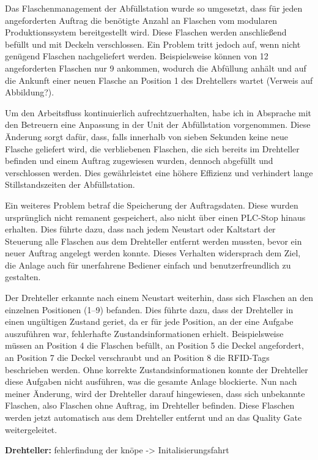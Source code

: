 Das Flaschenmanagement der Abfüllstation wurde so umgesetzt, dass für jeden angeforderten Auftrag die benötigte Anzahl an Flaschen vom modularen 
Produktionssystem bereitgestellt wird. Diese Flaschen werden anschließend befüllt und mit Deckeln verschlossen. Ein Problem tritt jedoch auf, 
wenn nicht genügend Flaschen nachgeliefert werden. Beispielsweise können von 12 angeforderten Flaschen nur 9 ankommen, wodurch die Abfüllung 
anhält und auf die Ankunft einer neuen Flasche an Position 1 des Drehtellers wartet (Verweis auf Abbildung?).

Um den Arbeitsfluss kontinuierlich aufrechtzuerhalten, habe ich in Absprache mit den Betreuern eine Anpassung in der Unit der Abfüllstation 
vorgenommen. Diese Änderung sorgt dafür, dass, falls innerhalb von sieben Sekunden keine neue Flasche geliefert wird, die verbliebenen Flaschen, 
die sich bereits im Drehteller befinden und einem Auftrag zugewiesen wurden, dennoch abgefüllt und verschlossen werden. Dies gewährleistet eine 
höhere Effizienz und verhindert lange Stillstandszeiten der Abfüllstation.

Ein weiteres Problem betraf die Speicherung der Auftragsdaten. Diese wurden ursprünglich nicht remanent gespeichert, also nicht über einen 
PLC-Stop hinaus erhalten. Dies führte dazu, dass nach jedem Neustart oder Kaltstart der Steuerung alle Flaschen aus dem Drehteller entfernt 
werden mussten, bevor ein neuer Auftrag angelegt werden konnte. Dieses Verhalten widersprach dem Ziel, die Anlage auch für unerfahrene Bediener 
einfach und benutzerfreundlich zu gestalten.

Der Drehteller erkannte nach einem Neustart weiterhin, dass sich Flaschen an den einzelnen Positionen (1–9) befanden. Dies führte dazu, dass der 
Drehteller in einen ungültigen Zustand geriet, da er für jede Position, an der eine Aufgabe auszuführen war, fehlerhafte Zustandsinformationen 
erhielt. Beispielsweise müssen an Position 4 die Flaschen befüllt, an Position 5 die Deckel angefordert, an Position 7 die Deckel verschraubt und 
an Position 8 die RFID-Tags beschrieben werden. Ohne korrekte Zustandsinformationen konnte der Drehteller diese Aufgaben nicht ausführen, was die 
gesamte Anlage blockierte. Nun nach meiner Änderung, wird der Drehteller darauf hingewiesen, dass sich unbekannte Flaschen, also Flaschen ohne 
Auftrag, im Drehteller befinden. Diese Flaschen werden jetzt automatisch aus dem Drehteller entfernt und an das Quality Gate weitergeleitet.

\textbf{Drehteller:} 
fehlerfindung der knöpe -> Initalisierungsfahrt 


